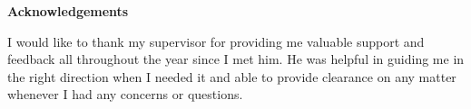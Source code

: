 \mbox{}\newline\vspace{10mm} \mbox{}\LARGE
%
{\bf Acknowledgements} \normalsize \vspace{5mm}

I would like to thank my supervisor for providing me valuable support and feedback all throughout the year since I met him. He was helpful in guiding me in the right direction when I needed it and able to provide clearance on any matter whenever I had any concerns or questions. 
